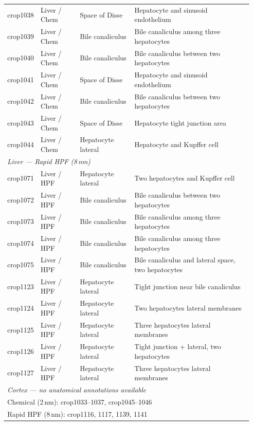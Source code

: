 \documentclass[times, twoside]{zHenriquesLab-StyleBioRxiv}
\begin{document}
\begin{table}[t]
\begin{tabular}{llp{2.5cm}p{5.5cm}}
crop1038 & Liver / Chem & Space of Disse & Hepatocyte and sinusoid endothelium \\
crop1039 & Liver / Chem & Bile canaliculus & Bile canaliculus among three hepatocytes \\
crop1040 & Liver / Chem & Bile canaliculus & Bile canaliculus between two hepatocytes \\
crop1041 & Liver / Chem & Space of Disse & Hepatocyte and sinusoid endothelium \\
crop1042 & Liver / Chem & Bile canaliculus & Bile canaliculus between two hepatocytes \\
crop1043 & Liver / Chem & Space of Disse & Hepatocyte tight junction area \\
crop1044 & Liver / Chem & Hepatocyte lateral & Hepatocyte and Kupffer cell \\
\midrule
\multicolumn{4}{l}{\textit{Liver --- Rapid HPF (8\,nm)}} \\
crop1071 & Liver / HPF & Hepatocyte lateral & Two hepatocytes and Kupffer cell \\
crop1072 & Liver / HPF & Bile canaliculus & Bile canaliculus between two hepatocytes \\
crop1073 & Liver / HPF & Bile canaliculus & Bile canaliculus among three hepatocytes \\
crop1074 & Liver / HPF & Bile canaliculus & Bile canaliculus among three hepatocytes \\
crop1075 & Liver / HPF & Bile canaliculus & Bile canaliculus and lateral space, two hepatocytes \\
crop1123 & Liver / HPF & Hepatocyte lateral & Tight junction near bile canaliculus \\
crop1124 & Liver / HPF & Hepatocyte lateral & Two hepatocytes lateral membranes \\
crop1125 & Liver / HPF & Hepatocyte lateral & Three hepatocytes lateral membranes \\
crop1126 & Liver / HPF & Hepatocyte lateral & Tight junction + lateral, two hepatocytes \\
crop1127 & Liver / HPF & Hepatocyte lateral & Three hepatocytes lateral membranes \\
\midrule
\multicolumn{4}{l}{\textit{Cortex --- no anatomical annotations available}} \\
\multicolumn{4}{l}{Chemical (2\,nm): crop1033--1037, crop1045--1046} \\
\multicolumn{4}{l}{Rapid HPF (8\,nm): crop1116, 1117, 1139, 1141} \\
\bottomrule
\end{tabular}
\end{table}
\end{document}

